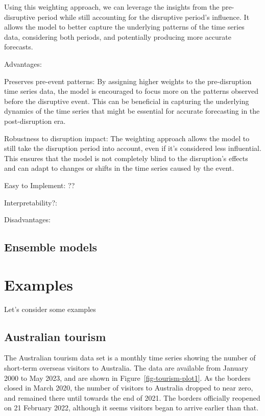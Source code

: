\documentclass[11pt,a4paper,]{article}
\begin{document}
Using this weighting approach, we can leverage the insights from the
pre-disruptive period while still accounting for the disruptive period's
influence. It allows the model to better capture the underlying patterns
of the time series data, considering both periods, and potentially
producing more accurate forecasts.

Advantages:

Preserves pre-event patterns: By assigning higher weights to the
pre-disruption time series data, the model is encouraged to focus more
on the patterns observed before the disruptive event. This can be
beneficial in capturing the underlying dynamics of the time series that
might be essential for accurate forecasting in the post-disruption era.

Robustness to disruption impact: The weighting approach allows the model
to still take the disruption period into account, even if it's
considered less influential. This ensures that the model is not
completely blind to the disruption's effects and can adapt to changes or
shifts in the time series caused by the event.

Easy to Implement: ??

Interpretability?:

Disadvantages:

\subsection{Ensemble models}\label{ensemble-models}

\section{Examples}\label{examples}

Let's consider some examples

\subsection{Australian tourism}\label{australian-tourism}

The Australian tourism data set is a monthly time series showing the
number of short-term overseas visitors to Australia. The data
\autocite{tourismdata} are available from January 2000 to May 2023, and
are shown in Figure~\ref{fig-tourism-plot1}. As the borders closed in
March 2020, the number of visitors to Australia dropped to near zero,
and remained there until towards the end of 2021. The borders officially
reopened on 21 February 2022, although it seems visitors began to arrive
earlier than that.
\end{document}
